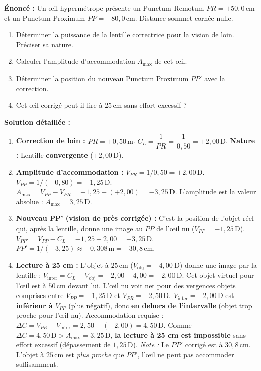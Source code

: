 \documentclass[11pt]{article}
\begin{document}
\begin{exoresolu}
\textbf{Énoncé :} Un œil hypermétrope présente un Punctum Remotum $PR = +50,0\,\text{cm}$ et un Punctum Proximum $PP = -80,0\,\text{cm}$. Distance sommet-cornée nulle.
\begin{enumerate}
    \item Déterminer la puissance de la lentille correctrice pour la vision de loin. Préciser sa nature.
    \item Calculer l'amplitude d'accommodation $A_{\text{max}}$ de cet œil.
    \item Déterminer la position du nouveau Punctum Proximum $PP'$ avec la correction.
    \item Cet œil corrigé peut-il lire à $25\,\text{cm}$ sans effort excessif ?
\end{enumerate}

\tcblower
\textbf{Solution détaillée :}
\begin{enumerate}
    \item \textbf{Correction de loin :} $PR = +0,50\,\text{m}$.
    $C_L = \dfrac{1}{PR} = \dfrac{1}{0,50} = +2,00\,\text{D}$.
    \textbf{Nature :} Lentille \textbf{convergente} ($+2,00\,\text{D}$).
    \item \textbf{Amplitude d'accommodation :}
    $V_{PR} = 1/0,50 = +2,00\,\text{D}$.
    $V_{PP} = 1/(-0,80) = -1,25\,\text{D}$.
    $A_{\text{max}} = V_{PP} - V_{PR} = -1,25 - (+2,00) = -3,25\,\text{D}$.
    L'amplitude est la valeur absolue : $A_{\text{max}} = 3,25\,\text{D}$.
    \item \textbf{Nouveau PP' (vision de près corrigée) :} C'est la position de l'objet réel qui, après la lentille, donne une image au $PP$ de l'œil nu ($V_{PP} = -1,25\,\text{D}$).
    $V_{PP'} = V_{PP} - C_L = -1,25 - 2,00 = -3,25\,\text{D}$.
    $PP' = 1/(-3,25) \approx -0,308\,\text{m} = -30,8\,\text{cm}$.
    \item \textbf{Lecture à 25 cm :} L'objet à $25\,\text{cm}$ ($V_{\text{obj}}=-4,00\,\text{D}$) donne une image par la lentille :
    $V_{\text{inter}} = C_L + V_{\text{obj}} = +2,00 - 4,00 = -2,00\,\text{D}$.
    Cet objet virtuel pour l'œil est à $50\,\text{cm}$ devant lui.
    L'œil nu voit net pour des vergences objets comprises entre $V_{PP}=-1,25\,\text{D}$ et $V_{PR}=+2,50\,\text{D}$.
    $V_{\text{inter}} = -2,00\,\text{D}$ est \textbf{inférieur à $V_{PP}$} (plus négatif), donc \textbf{en dehors de l'intervalle} (objet trop proche pour l'œil nu).
    Accommodation requise : $\Delta C = V_{PR} - V_{\text{inter}} = 2,50 - (-2,00) = 4,50\,\text{D}$.
    Comme $\Delta C = 4,50\,\text{D} > A_{\text{max}} = 3,25\,\text{D}$, \textbf{la lecture à 25 cm est impossible} sans effort excessif (dépassement de $1,25\,\text{D}$).
    \textit{Note :} Le $PP'$ corrigé est à $30,8\,\text{cm}$. L'objet à $25\,\text{cm}$ est \emph{plus proche} que $PP'$, l'œil ne peut pas accommoder suffisamment.
\end{enumerate}
\end{exoresolu}
\end{document}
